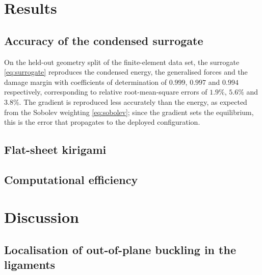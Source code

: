 \documentclass[pdflatex,sn-mathphys-num]{sn-jnl}%
\theoremstyle{thmstyleone}%
\theoremstyle{thmstyletwo}%
\theoremstyle{thmstylethree}%
\begin{document}
\section{Results}\label{sec:results}

\subsection{Accuracy of the condensed surrogate}

On the held-out geometry split of the finite-element data set, the surrogate
\eqref{eq:surrogate} reproduces the condensed energy, the generalised forces and
the damage margin with coefficients of determination of $0.999$, $0.997$ and
$0.994$ respectively, corresponding to relative root-mean-square errors of
$1.9\%$, $5.6\%$ and $3.8\%$. The gradient is reproduced less accurately than the
energy, as expected from the Sobolev weighting \eqref{eq:sobolev}; since the
gradient sets the equilibrium, this is the error that propagates to the deployed
configuration.

\subsection{Flat-sheet kirigami}


\subsection{Computational efficiency}


\section{Discussion}\label{sec:discussion}

\subsection{Localisation of out-of-plane buckling in the ligaments}
\label{sec:buckling-locality}
\end{document}
